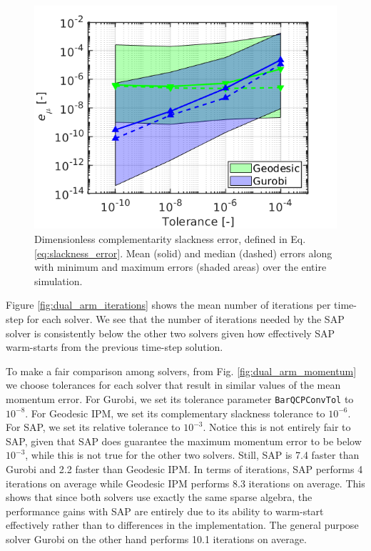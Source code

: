 \begin{figure}[!h]
	\centering
    \includegraphics[width=0.7\columnwidth]{figures/dual_arm/optimality_condition.png}
    \caption{\label{fig:dual_arm_slackness} Dimensionless complementarity
    slackness error, defined in Eq. \eqref{eq:slackness_error}. Mean (solid) and
    median (dashed) errors along with minimum and maximum errors (shaded areas)
    over the entire simulation.}
\end{figure}

Figure \ref{fig:dual_arm_iterations} shows the mean number of iterations per
time-step for each solver. We see that the number of iterations needed by the
SAP solver is consistently below the other two solvers given how effectively SAP
warm-starts from the previous time-step solution.

To make a fair comparison among solvers, from Fig. \ref{fig:dual_arm_momentum}
we choose tolerances for each solver that result in similar values of the mean
momentum error. For Gurobi, we set its tolerance parameter \verb+BarQCPConvTol+
to $10^{-8}$. For Geodesic IPM, we set its complementary slackness tolerance to
$10^{-6}$. For SAP, we set its relative tolerance to $10^{-3}$. Notice this is
not entirely fair to SAP, given that SAP does guarantee the maximum momentum
error to be below $10^{-3}$, while this is not true for the other two solvers.
Still, SAP is 7.4 faster than Gurobi and 2.2 faster than Geodesic IPM. In terms
of iterations, SAP performs 4 iterations on average while Geodesic IPM performs
8.3 iterations on average. This shows that since both solvers use exactly the
same sparse algebra, the performance gains with SAP are entirely due to its
ability to warm-start effectively rather than to differences in the
implementation. The general purpose solver Gurobi on the other hand performs
10.1 iterations on average.

